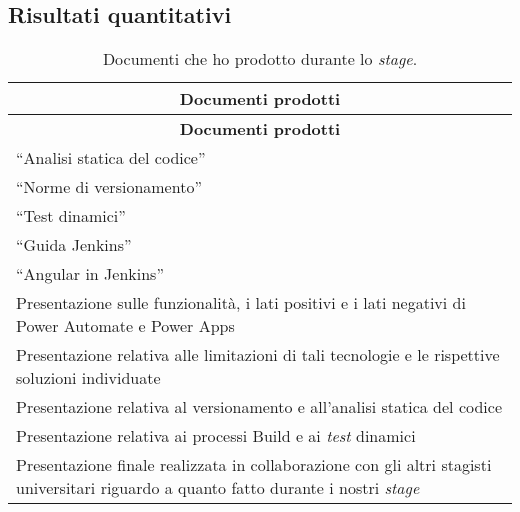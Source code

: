 \subsection{Risultati quantitativi}
\begingroup
\renewcommand\arraystretch{1.3}
\begin{longtable}{|p{11cm}|}
    \caption{Documenti che ho prodotto durante lo \emph{stage}.}
    \label{tab:risultatiQualitativi}\\
    \hline \multicolumn{1}{|c|}{\textbf{Documenti prodotti}}\\ \hline \endfirsthead
    \hline \multicolumn{1}{|c|}{\textbf{Documenti prodotti}}\\ \hline \endhead
    \hline \endfoot
    \hline \endlastfoot
    \hline “Analisi statica del codice”\\
    \hline “Norme di versionamento”\\
    \hline “Test dinamici”\\
    \hline “Guida Jenkins”\\
    \hline “Angular in Jenkins”\\
    \hline Presentazione sulle funzionalità, i lati positivi e i lati negativi di Power Automate e Power Apps\\
    \hline Presentazione relativa alle limitazioni di tali tecnologie e le rispettive soluzioni individuate\\
    \hline Presentazione relativa al versionamento e all'analisi statica del codice\\
    \hline Presentazione relativa ai processi Build e ai \emph{test} dinamici\\
    \hline Presentazione finale realizzata in collaborazione con gli altri stagisti universitari riguardo a quanto fatto durante i nostri \emph{stage}\\
\end{longtable}
\endgroup
 
